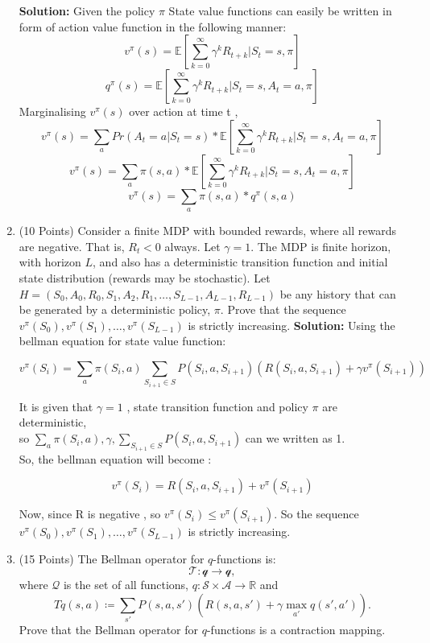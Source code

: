 \documentclass{article}
\begin{document}
\begin{enumerate}
    \textbf{Solution:} Given the policy $\pi$ State value functions can easily be written in form of action value function in the following manner: \\
    
    \[v^{\pi}(s) =\mathbb{E}[\sum_{k=0}^{\infty}{\gamma^k R_{t+k} | S_t = s, \pi}]\]	
    \[q^{\pi}(s) = \mathbb{E}[\sum_{k=0}^{\infty}{\gamma^k R_{t+k} | S_t = s, A_t = a, \pi}]\]
    Marginalising $v^{\pi}(s)$ over action at time t , 
    \[v^{\pi}(s) =\sum_{a}Pr(A_t = a | S_t = s)* \mathbb{E}[\sum_{k=0}^{\infty}{\gamma^k R_{t+k} | S_t = s, A_t = a, \pi}]\]	
    \[v^{\pi}(s) =\sum_{a}\pi(s,a)* \mathbb{E}[\sum_{k=0}^{\infty}{\gamma^k R_{t+k} | S_t = s, A_t = a, \pi}]\]	
        \[v^{\pi}(s) =\sum_{a}\pi(s,a)* q^{\pi}(s,a)\]
    
    \item (10 Points) Consider a finite MDP with bounded rewards, where all rewards are negative. That is, $R_t < 0$ always. Let $\gamma=1$. The MDP is finite horizon, with horizon $L$, and also has a deterministic transition function and initial state distribution (rewards may be stochastic). Let $H=(S_0,A_0,R_0,S_1,A_2,R_1,\dotsc,S_{L-1},A_{L-1},R_{L-1})$ be any history that can be generated by a deterministic policy, $\pi$. Prove that the sequence $v^\pi(S_0), v^\pi(S_1),\dotsc,v^\pi(S_{L-1})$ is strictly increasing.
    \textbf{Solution:} Using the bellman equation for state value function:
        
     \[v^{\pi}(S_i) =\sum_{a} \pi(S_i,a) \sum_{S_{i+1} \in S} P(S_i , a, S_{i+1}) ( R(S_i , a , S_{i+1}) + \gamma v^{\pi}(S_{i+1}))\]
     
     It is given that $\gamma = 1$ , state transition function and policy $\pi$ are deterministic, \\ so $\sum_{a} \pi(S_i,a) , \gamma ,  \sum_{S_{i+1} \in S} P(S_i , a, S_{i+1})$ can we written as 1.\\
     
     So, the bellman equation will become : 
     
     \[v^{\pi}(S_i) = R(S_i , a , S_{i+1}) + v^{\pi}(S_{i+1})\]
     
     Now, since R is negative , so $v^{\pi}(S_i) \leq v^{\pi}(S_{i+1}) $. So the sequence $v^\pi(S_0), v^\pi(S_1),\dotsc,v^\pi(S_{L-1})$ is strictly increasing.
    
    \item (15 Points) The Bellman operator for $q$-functions is:
    $$
    \mathcal T:\mathcal q \to \mathcal q,
    $$
    where $\mathcal Q$ is the set of all functions, $q:\mathcal S \times \mathcal A \to \mathbb R$ and
    $$
    Tq(s,a)\coloneqq \sum_{s'}P(s,a,s')\left ( R(s,a,s') + \gamma \max_{a'} q(s',a')\right ).
    $$
    Prove that the Bellman operator for $q$-functions is a contraction mapping.
    

\end{enumerate}
\end{document}
